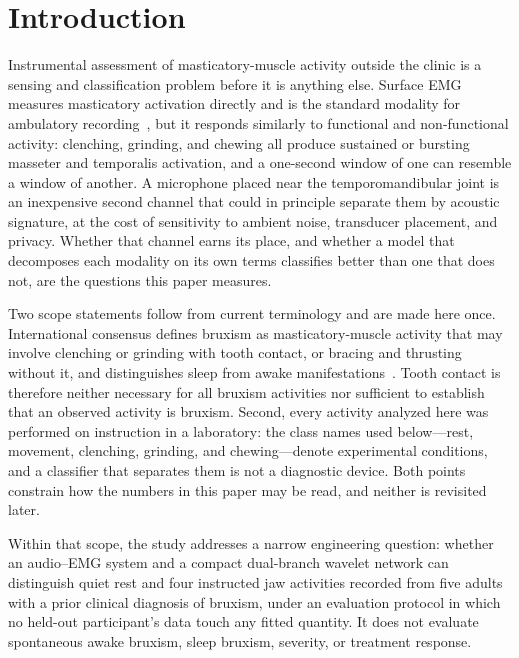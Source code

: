 \documentclass[pdflatex,sn-nature,iicol]{sn-jnl}
\begin{document}

\maketitle

\section{Introduction}

Instrumental assessment of masticatory-muscle activity outside the clinic is a sensing and classification problem before it is anything else. Surface EMG measures masticatory activation directly and is the standard modality for ambulatory recording~\cite{raez2006techniques,colonna2023electromyographic}, but it responds similarly to functional and non-functional activity: clenching, grinding, and chewing all produce sustained or bursting masseter and temporalis activation, and a one-second window of one can resemble a window of another. A microphone placed near the temporomandibular joint is an inexpensive second channel that could in principle separate them by acoustic signature, at the cost of sensitivity to ambient noise, transducer placement, and privacy. Whether that channel earns its place, and whether a model that decomposes each modality on its own terms classifies better than one that does not, are the questions this paper measures.

Two scope statements follow from current terminology and are made here once. International consensus defines bruxism as masticatory-muscle activity that may involve clenching or grinding with tooth contact, or bracing and thrusting without it, and distinguishes sleep from awake manifestations~\cite{lobbezoo2018international,verhoeff2025definitions}. Tooth contact is therefore neither necessary for all bruxism activities nor sufficient to establish that an observed activity is bruxism. Second, every activity analyzed here was performed on instruction in a laboratory: the class names used below---rest, movement, clenching, grinding, and chewing---denote experimental conditions, and a classifier that separates them is not a diagnostic device. Both points constrain how the numbers in this paper may be read, and neither is revisited later.

Within that scope, the study addresses a narrow engineering question: whether an audio--EMG system and a compact dual-branch wavelet network can distinguish quiet rest and four instructed jaw activities recorded from five adults with a prior clinical diagnosis of bruxism, under an evaluation protocol in which no held-out participant's data touch any fitted quantity. It does not evaluate spontaneous awake bruxism, sleep bruxism, severity, or treatment response.
\end{document}
